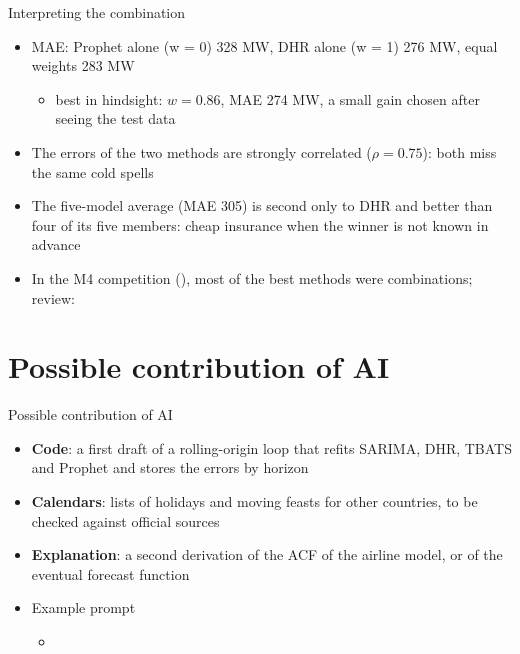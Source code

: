 \begin{frame}{Interpreting the combination}
\itemsize{\footnotesize}
\begin{itemize}
    \item MAE: Prophet alone (w = 0) 328 MW, DHR alone (w = 1) 276 MW, equal weights 283 MW
    \begin{itemize}
        \item best in hindsight: $w = 0.86$, MAE 274 MW, a small gain chosen after seeing the test data
    \end{itemize}
    \item The errors of the two methods are strongly correlated ($\rho = 0.75$): both miss the same cold spells
    \item The five-model average (MAE 305) is second only to DHR and better than four of its five members: cheap insurance when the winner is not known in advance
    \item In the M4 competition (), most of the best methods were combinations; review: 
\end{itemize}
\end{frame}


\section{Possible contribution of AI}

\begin{frame}{Possible contribution of AI}
\itemsize{\small}
\begin{itemize}
    \item \textbf{Code}: a first draft of a rolling-origin loop that refits SARIMA, DHR, TBATS and Prophet and stores the errors by horizon
    \item \textbf{Calendars}: lists of holidays and moving feasts for other countries, to be checked against official sources
    \item \textbf{Explanation}: a second derivation of the ACF of the airline model, or of the eventual forecast function
    \item Example prompt
    \begin{itemize}
        \item {}
    \end{itemize}
\end{itemize}
\end{frame}

